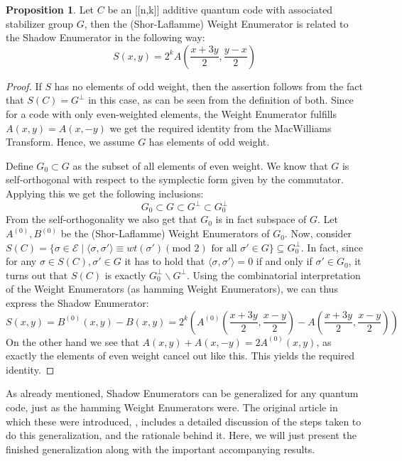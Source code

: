 \documentclass[12pt,a4paper,BCOR15mm,twoside,DIV12]{article}
\def\E{\mathcal{E}}
\def\fa{\text{ for all }}
\theoremstyle{definition}
\newtheorem{prop}[Satz]{Proposition}
\begin{document}
\begin{prop}\label{macwillshadowstab}
Let $C$ be an [[n,k]] additive quantum code with associated stabilizer group $G$, then the (Shor-Laflamme) Weight Enumerator is related to the Shadow Enumerator in the following way:
\begin{equation}
S(x,y) = 2^k A(\frac{x+3y}{2},\frac{y-x}{2})
\end{equation}
\begin{proof}
If $S$ has no elements of odd weight, then the assertion follows from the fact that $S(C) = G^\perp$ in this case, as can be seen from the definition of both. Since for a code with only even-weighted elements, the Weight Enumerator
fulfills $A(x,y) = A(x,-y)$ we get the required identity from the MacWilliams Transform. Hence, we assume $G$ has elements of odd weight.

Define $G_0 \subset G$ as the subset of all elements of even weight. We know that $G$ is self-orthogonal with respect to the symplectic form given by the commutator. Applying this we get the following inclusions:
\begin{equation}
G_0 \subset G \subset G^\perp \subset G_0^\perp
\end{equation}
From the self-orthogonality we also get that $G_0$ is in fact subspace of $G$. Let $A^{(0)}, B^{(0)}$ be the (Shor-Laflamme) Weight Enumerators of $G_0$. 
Now, consider $S(C) = \{ \sigma \in \E \mid \langle \sigma, \sigma' \rangle \equiv wt(\sigma') (\text{mod }2) \fa \sigma' \in G \} \subseteq G_0^\perp$.
In fact, since for any $\sigma \in S(C), \sigma' \in G$ it has to hold that $\langle \sigma, \sigma' \rangle = 0$ if and only if $\sigma' \in G_0$, it turns out that
$S(C)$ is exactly $G_0^\perp \backslash G^\perp$. Using the combinatorial interpretation of the Weight Enumerators (as hamming Weight Enumerators), we can thus express the Shadow Enumerator:
\begin{equation}
S(x,y) = B^{(0)}(x,y) - B(x,y) = 2^k(A^{(0)}(\frac{x+3y}{2},\frac{x-y}{2}) - A(\frac{x+3y}{2},\frac{x-y}{2}))
\end{equation}
On the other hand we see that $A(x,y) + A(x,-y) = 2A^{(0)}(x,y)$, as exactly the elements of even weight cancel out like this. This yields the required identity.
\end{proof}
\end{prop}

As already mentioned, Shadow Enumerators can be generalized for any quantum code, just as the hamming Weight Enumerators were. The original article in which these were introduced, \cite{shadow}, includes a detailed discussion 
of the steps taken to do this generalization, and the rationale behind it. Here, we will just present the finished generalization along with the important accompanying results. 
\end{document}
